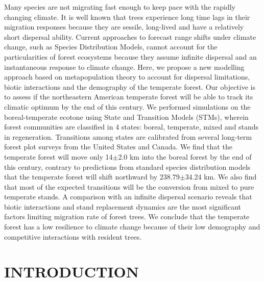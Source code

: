 Many species are not migrating fast enough to keep pace with the rapidly changing climate. It is well known that trees experience long time lags in their migration responses because they are sessile, long-lived and have a relatively short dispersal ability. Current approaches to forecast range shifts under climate change, such as Species Distribution Models, cannot account for the particularities of forest ecosystems because they assume infinite dispersal and an instantaneous response to climate change. Here, we propose a new modelling approach based on metapopulation theory to account for dispersal limitations, biotic interactions and the demography of the temperate forest. Our objective is to assess if the northeastern American temperate forest will be able to track its climatic optimum by the end of this century. We performed simulations on the boreal-temperate ecotone using State and Transition Models (STMs), wherein forest communities are classified in 4 states: boreal, temperate, mixed and stands in regeneration. Transitions among states are calibrated from several long-term forest plot surveys from the United States and Canada. We find that the temperate forest will move only 14$\pm$2.0 km into the boreal forest by the end of this century, contrary to predictions from standard species distribution models that the temperate forest will shift northward by 238.79$\pm$34.24 km. We also find that most of the expected transitions will be the conversion from mixed to pure temperate stands. A comparison with an infinite dispersal scenario reveals that biotic interactions and stand replacement dynamics are the most significant factors limiting migration rate of forest trees. We conclude that the temperate forest has a low resilience to climate change because of their low demography and competitive interactions with resident trees.


\cleardoublepage

\section*{\uppercase{Introduction}}

